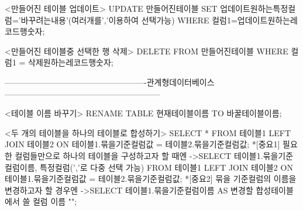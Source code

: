 <만들어진 테이블 업데이트>
UPDATE 만들어진테이블 SET 업데이트원하는특정컬럼='바꾸려는내용'(여러개를','이용하여 선택가능) WHERE 컬럼1=업데이트원하는레코드행숫자;

<만들어진 테이블중 선택한 행 삭제>
DELETE FROM 만들어진테이블 WHERE 컬럼1 = 삭제원하는레코드행숫자;

----------------------------------------------------관계형데이터베이스---------------------------------------------------------

<테이블 이름 바꾸기>
RENAME TABLE 현재테이블이름 TO 바꿀테이블이름;

<두 개의 테이블을 하나의 테이블로 합성하기>
SELECT * FROM 테이블1 LEFT JOIN 테이블2 ON 테이블1.묶을기준컬럼값 = 테이블2.묶을기준컬럼값;
*[중요1]
필요한 컬럼들만으로 하나의 테이블을 구성하고자 할 때엔
->SELECT 테이블1.묶을기준컬럼이름, 특정컬럼(','로 다중 선택 가능) FROM 테이블1 LEFT JOIN 테이블2 ON 테이블1.묶을기준컬럼값 = 테이블2.묶을기준컬럼값;
*[중요2]
묶을 기준컬럼의 이름을 변경하고자 할 경우엔
->SELECT 테이블1.묶을기준컬럼이름 AS 변경할 합성테이블에서 쓸 컬럼 이름 "";


